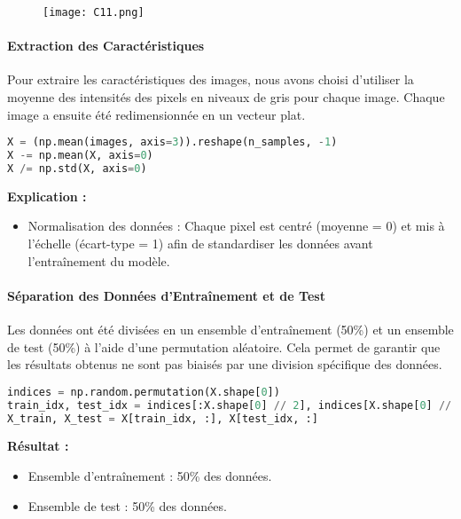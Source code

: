 \documentclass[12pt,a4paper]{report}
\begin{document}
\begin{figure}[H]
    \centering
    \begin{minipage}{0.9\textwidth}
        \centering
        \texttt{[image: C11.png]}
    \end{minipage}
    \end{figure}

\paragraph{Extraction des Caractéristiques\\}
Pour extraire les caractéristiques des images, nous avons choisi d'utiliser la moyenne des intensités des pixels en niveaux de gris pour chaque image. Chaque image a ensuite été redimensionnée en un vecteur plat.

\begin{lstlisting}[language=Python, caption=Extraction des caractéristiques]
X = (np.mean(images, axis=3)).reshape(n_samples, -1)
X -= np.mean(X, axis=0)
X /= np.std(X, axis=0)
\end{lstlisting}

\textbf{Explication :}
\begin{itemize}
    \item Normalisation des données : Chaque pixel est centré (moyenne = 0) et mis à l'échelle (écart-type = 1) afin de standardiser les données avant l'entraînement du modèle.
\end{itemize}

\paragraph{Séparation des Données d'Entraînement et de Test}
Les données ont été divisées en un ensemble d'entraînement (50\%) et un ensemble de test (50\%) à l'aide d'une permutation aléatoire. Cela permet de garantir que les résultats obtenus ne sont pas biaisés par une division spécifique des données.

\begin{lstlisting}[language=Python, caption=Séparation des données]
indices = np.random.permutation(X.shape[0])
train_idx, test_idx = indices[:X.shape[0] // 2], indices[X.shape[0] // 2:]
X_train, X_test = X[train_idx, :], X[test_idx, :]
\end{lstlisting}

\textbf{Résultat :}
\begin{itemize}
    \item Ensemble d'entraînement : 50\% des données.
    \item Ensemble de test : 50\% des données.
\end{itemize}
\end{document}

